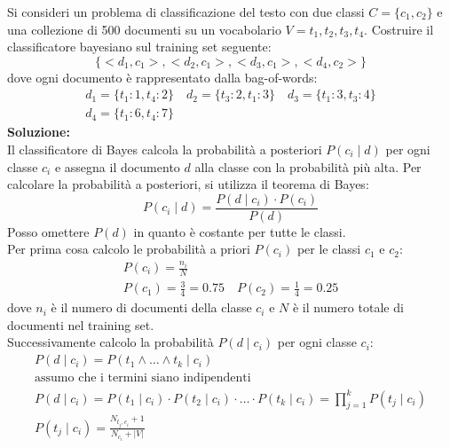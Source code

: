 \documentclass{report}
\begin{document}
	\begin{tcolorbox}[title=Esercizio di esempio]
		Si consideri un problema di classificazione del testo con due classi $C = \{c_1, c_2\}$ e una collezione di 500 documenti su un vocabolario $V = {t_1, t_2, t_3, t_4}$. Costruire il classificatore bayesiano sul training set seguente:
		\[
			\{<d_1, c_1>, <d_2, c_1>, <d_3, c_1>, <d_4, c_2>\}
		\]
		dove ogni documento è rappresentato dalla bag-of-words:
		\[
			\begin{array}{l}
				d_1 = \{t_1: 1, t_4: 2\} \quad
				d_2 = \{t_3: 2, t_1: 3\} \quad
				d_3 = \{t_1: 3, t_3: 4\} \\
				d_4 = \{t_1: 6, t_4: 7\}
			\end{array}
		\]
		\textbf{Soluzione:}\\
			Il classificatore di Bayes calcola la probabilità a posteriori $P(c_i \mid d)$ per ogni classe $c_i$ e assegna il documento $d$ alla classe con la probabilità più alta. Per calcolare la probabilità a posteriori, si utilizza il teorema di Bayes:
			\[
				P(c_i \mid d) = \frac{P(d \mid c_i) \cdot P(c_i)}{P(d)}
			\]
			Posso omettere $P(d)$ in quanto è costante per tutte le classi.
			\vspace{\baselineskip}\\
			Per prima cosa calcolo le probabilità a priori $P(c_i)$ per le classi $c_1$ e $c_2$:
			\[
				\begin{array}{l}
					P(c_i) = \frac{n_i}{N} \\
					P(c_1) = \frac{3}{4} = 0.75 \quad P(c_2) = \frac{1}{4} = 0.25
				\end{array}
			\]
			dove $n_i$ è il numero di documenti della classe $c_i$ e $N$ è il numero totale di documenti nel training set.
			\vspace{\baselineskip}\\
			Successivamente calcolo la probabilità $P(d \mid c_i)$ per ogni classe $c_i$:
			\[
				\begin{array}{l}
					P(d \mid c_i) = P(t_1 \land \dots \land t_k \mid c_i) \\
					\text{assumo che i termini siano indipendenti} \\
					P(d \mid c_i) = P(t_1 \mid c_i) \cdot P(t_2 \mid c_i) \cdot \dots \cdot P(t_k \mid c_i) = \prod_{j=1}^{k} P(t_j \mid c_i) \\
					P(t_j \mid c_i) = \frac{N_{t_j, c_i} + 1}{N_{c_i} + |V|} \\\\
					\begin{array}{l}

\end{array}
\end{array}\]
\end{tcolorbox}
\end{document}

